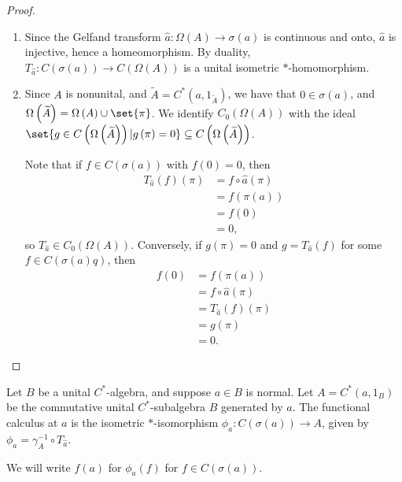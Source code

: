 \documentclass[10pt]{mypackage}
\begin{document}
\begin{proof}\hfill
  \begin{enumerate}[(1)]
    \item Since the Gelfand transform $\hat{a}\colon \Omega\left(A\right)\rightarrow \sigma\left(a\right)$ is continuous and onto, $\hat{a}$ is injective, hence a homeomorphism. By duality, $T_{\hat{a}}\colon C\left(\sigma\left(a\right)\right)\rightarrow C\left(\Omega\left(A\right)\right)$ is a unital isometric $\ast$-homomorphism.
    \item Since $A$ is nonunital, and $\widetilde{A} = C^{\ast}\left(a,1_{\widetilde{A}}\right)$, we have that $0\in\sigma\left(a\right)$, and $\Omega\left(\widetilde{A}\right) = \Omega\left(A\right) \cup \set{\pi}$. We identify $C_0\left(\Omega\left(A\right)\right)$ with the ideal $\set{g\in C\left(\Omega\left(\widetilde{A}\right)\right) | g\left(\pi\right) = 0}\subseteq C\left(\Omega\left(\widetilde{A}\right)\right)$. \newline

      Note that if $f\in C\left(\sigma\left(a\right)\right)$ with $f(0) = 0$, then
      \begin{align*}
        T_{\hat{a}}\left(f\right)\left(\pi\right) &= f\circ \hat{a}\left(\pi\right)\\
                                                  &= f\left(\pi\left(a\right)\right)\\
                                                  &= f\left(0\right)\\
                                                  &= 0,
      \end{align*}
      so $T_{\hat{a}}\in C_0\left(\Omega\left(A\right)\right)$. Conversely, if $g\left(\pi\right) = 0$ and $g = T_{\hat{a}}\left(f\right)$ for some $f\in C\left(\sigma\left(a\right)q\right)$, then
      \begin{align*}
        f\left(0\right) &= f\left(\pi\left(a\right)\right)\\
                        &= f\circ\hat{a}\left(\pi\right)\\
                        &= T_{\hat{a}}\left(f\right)\left(\pi\right)\\
                        &= g\left(\pi\right)\\
                        &= 0.
      \end{align*}
  \end{enumerate}
\end{proof}
\begin{definition}
  Let $B$ be a unital $C^{\ast}$-algebra, and suppose $a\in B$ is normal. Let $A = C^{\ast}\left(a,1_B\right)$ be the commutative unital $C^{\ast}$-subalgebra $B$ generated by $a$. The functional calculus at $a$ is the isometric $\ast$-isomorphism $\phi_a\colon C\left(\sigma\left(a\right)\right)\rightarrow A$, given by $\phi_a = \gamma_A^{-1}\circ T_{\hat{a}}$.\newline

  We will write $f(a)$ for $\phi_a\left(f\right)$ for $f\in C\left(\sigma\left(a\right)\right)$.
\end{definition}
\end{document}

